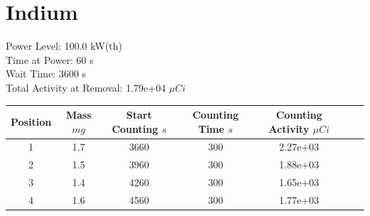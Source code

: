 \newpage

\section*{ Indium }

Power Level: 100.0 kW(th) \\
Time at Power: 60 s \\
Wait Time: 3600 s \\
Total Activity at Removal: 1.79e+04 $\mu Ci$

\begin{table}[h]
\centering
\begin{tabular}{ |c|c|c|c|c|c|c| }
 \hline
 Position & Mass $mg$ & Start Counting $s$ & Counting Time $s$ & Counting Activity $\mu Ci$ \\
 \hline 
 1 & 1.7 & 3660 & 300 & 2.27e+03\\ 
\hline
 2 & 1.5 & 3960 & 300 & 1.88e+03\\ 
\hline
 3 & 1.4 & 4260 & 300 & 1.65e+03\\ 
\hline
 4 & 1.6 & 4560 & 300 & 1.77e+03\\ 
\hline
\end{tabular}
\end{table}

\begin{figure}[!ht]
   \centering
   \quad
   \\ 
   \quad 

\end{figure}

